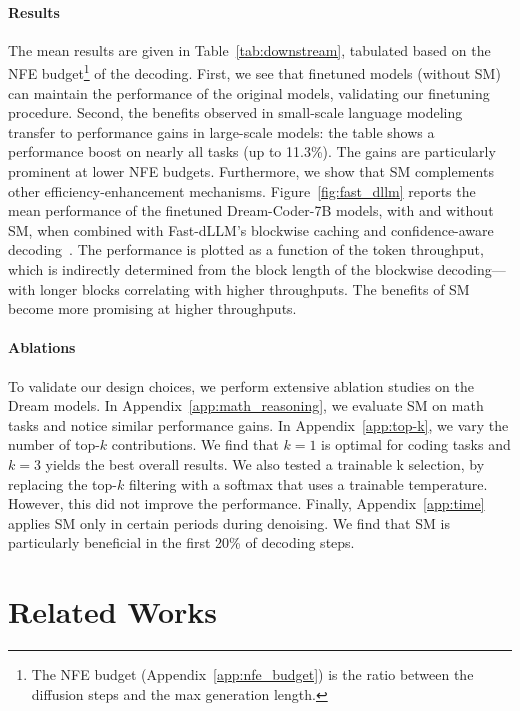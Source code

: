 \documentclass{article}
\begin{document}
\paragraph{Results}
The mean results are given in Table~\ref{tab:downstream}, tabulated based on the NFE budget\footnote{The NFE budget (Appendix~\ref{app:nfe_budget}) is the ratio between the diffusion steps and the max generation length.} of the decoding. 
% 
First, we see that finetuned models (without SM) can maintain the performance of the original models, validating our finetuning procedure. 
%
Second, the benefits observed in small-scale language modeling transfer to performance gains in large-scale models: the table shows a performance boost on nearly all tasks (up to 11.3\%). The gains are particularly prominent at lower NFE budgets.
% 
Furthermore, we show that SM complements other efficiency-enhancement mechanisms. Figure~\ref{fig:fast_dllm} reports the mean performance of the finetuned Dream-Coder-7B models, with and without SM, when combined with Fast-dLLM's blockwise caching and confidence-aware decoding~\citep{wu_fast-dllm_2025}. The performance is plotted as a function of the token throughput, which is indirectly determined from the block length of the blockwise decoding---with longer blocks correlating with higher throughputs. The benefits of SM become more promising at higher throughputs.



\paragraph{Ablations}
To validate our design choices, we perform extensive ablation studies on the Dream models. 
% 
In Appendix~\ref{app:math_reasoning}, we evaluate SM on math tasks and notice similar performance gains.
%
In Appendix~\ref{app:top-k}, we vary the number of top-$k$ contributions. 
%
We find that $k=1$ is optimal for coding tasks and $k=3$ yields the best overall results.  
% 
We also tested a trainable k selection, by replacing the top-$k$ filtering with a softmax that uses a trainable temperature. 
%
However, this did not improve the performance. 
% 
Finally, Appendix~\ref{app:time} applies SM only in certain periods during denoising. 
% 
We find that SM is particularly beneficial in the first 20\% of decoding steps.


\section{Related Works}
\end{document}

